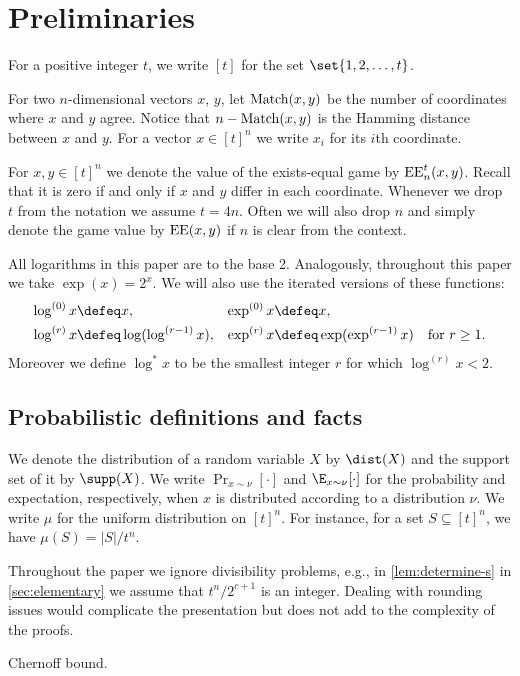 \section{Preliminaries}
\label{sec:preliminaries}
For a positive integer $t$, we write $[t]$ for the set $\set{1,2,\ldots,t}$.

For two $n$-dimensional vectors $x$, $y$, let
$\operatorname{Match}(x,y)$ be the number of coordinates where $x$ and $y$
agree. Notice that $n-\operatorname{Match}(x,y)$ is the Hamming distance
between $x$ and $y$. For a vector $x\in[t]^n$ we write $x_i$ for
its $i$\/th coordinate. 

For $x,y\in [t]^n$ we denote the value of the exists-equal game
by $\operatorname{EE}_n^t(x,y)$. Recall that it is zero if and only if $x$ and
$y$ differ in each coordinate. Whenever we drop $t$ from the
notation we assume $t=4n$. Often we will also drop $n$ and
simply denote the game value by $\operatorname{EE}(x,y)$ if $n$ is clear from
the context.

All logarithms in this paper are to the base 2. Analogously,
throughout this paper we take $\exp(x)=2^x$. We will also use
the iterated versions of these functions:
\begin{align*}
\log^{(0)}x&\defeq x, & \exp^{(0)}x&\defeq x,\\
\log^{(r)}x&\defeq \log(\log^{(r-1)}x), & \exp^{(r)}x&\defeq \exp(\exp^{(r-1)}x)
\quad\text{for $r\geq 1$}.
\end{align*}
Moreover we define $\log^* x$ to be the smallest integer $r$ for which
$\log^{(r)} x<2$. 


\subsection{Probabilistic definitions and facts}
\label{sec:prelim:prob}
We denote the distribution of a random
variable $X$ by $\dist(X)$ and the support set of it by
$\supp(X)$. We write $\Pr_{x\sim\nu}[\cdot]$ and
$\E_{x\sim\nu}[\cdot]$ for the probability and expectation,
respectively, when $x$ is distributed according to a
distribution $\nu$. We write $\mu$ for the uniform distribution
on $[t]^n$. For instance, for a set $S\subseteq [t]^n$, we have
$\mu(S) = |S| / t^n$.

Throughout the paper we ignore divisibility problems, e.g., in
\autoref{lem:determine-s} in \autoref{sec:elementary} we assume
that $t^n/2^{c+1}$ is an integer. Dealing with rounding issues
would complicate the presentation but does not add to the
complexity of the proofs.
\begin{theorem}
Chernoff bound.
\end{theorem}

